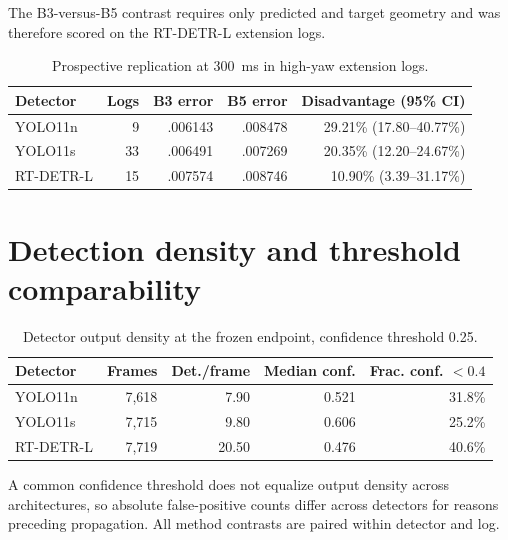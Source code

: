 \documentclass[11pt]{article}
\begin{document}
The B3-versus-B5 contrast requires only predicted and target geometry and was therefore scored on the RT-DETR-L extension logs.

\begin{table}[htbp]
\centering
\caption{Prospective replication at 300~ms in high-yaw extension logs.}
\small
\begin{tabular}{lrrrr}
\toprule
Detector & Logs & B3 error & B5 error & Disadvantage (95\% CI)\\
\midrule
YOLO11n & 9 & .006143 & .008478 & 29.21\% (17.80--40.77\%)\\
YOLO11s & 33 & .006491 & .007269 & 20.35\% (12.20--24.67\%)\\
RT-DETR-L & 15 & .007574 & .008746 & 10.90\% (3.39--31.17\%)\\
\bottomrule
\end{tabular}
\end{table}

\section{Detection density and threshold comparability}
\begin{table}[htbp]
\centering
\caption{Detector output density at the frozen endpoint, confidence threshold 0.25.}
\small
\begin{tabular}{lrrrr}
\toprule
Detector & Frames & Det./frame & Median conf. & Frac. conf. $<0.4$\\
\midrule
YOLO11n & 7,618 & 7.90 & 0.521 & 31.8\%\\
YOLO11s & 7,715 & 9.80 & 0.606 & 25.2\%\\
RT-DETR-L & 7,719 & 20.50 & 0.476 & 40.6\%\\
\bottomrule
\end{tabular}
\end{table}
A common confidence threshold does not equalize output density across architectures, so absolute false-positive counts differ across detectors for reasons preceding propagation. All method contrasts are paired within detector and log.
\end{document}
